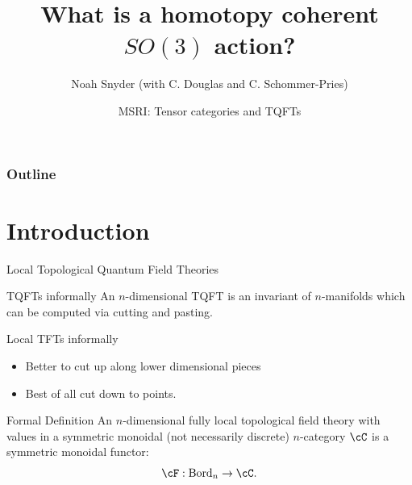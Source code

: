 \documentclass[beamer]{beamer}
\author[Noah Snyder]{Noah Snyder (with C. Douglas and C. Schommer-Pries)}
\title{What is a homotopy coherent $SO(3)$ action?}
\date{MSRI: Tensor categories and TQFTs}
\institute{Indiana University}
\begin{document}
\frame{\titlepage}

\begin{frame}
       \frametitle{Outline}
       \tableofcontents
\end{frame}

\beamertemplatetransparentcovered 

\beamersetuncovermixins 
{} 
{} 



\section{Introduction}

\begin{frame}{Local Topological Quantum Field Theories}
\begin{block}{TQFTs informally}
An $n$-dimensional TQFT is an invariant of $n$-manifolds which can be computed via cutting and pasting.
\end{block}

\begin{block}{Local TFTs informally}
\begin{itemize}
\item Better to cut up along lower dimensional pieces
\item Best of all cut down to points.
\end{itemize}
\end{block}

\begin{block}{Formal Definition}
An $n$-dimensional fully local topological field theory with values in a symmetric monoidal (not necessarily discrete) $n$-category  $\cC$ is a symmetric monoidal functor:
$$\cF: \mathrm{Bord}_n \rightarrow \cC.$$
\end{block}
\end{frame}
\end{document}
